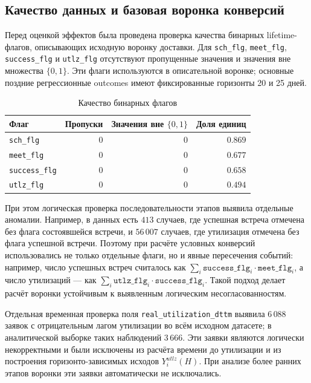 \documentclass[14pt,a4paper]{extarticle}
\begin{document}
\subsection{Качество данных и базовая воронка конверсий} 
\label{subsec:conversion_funnel_results}

Перед оценкой эффектов была проведена проверка качества бинарных lifetime-флагов, описывающих исходную воронку доставки. Для \texttt{sch\_flg}, \texttt{meet\_flg}, \texttt{success\_flg} и \texttt{utlz\_flg} отсутствуют пропущенные значения и значения вне множества \(\{0,1\}\). Эти флаги используются в описательной воронке; основные поздние регрессионные outcomes имеют фиксированные горизонты 20 и 25 дней.

\begin{table}[H]
    \centering
    \caption{Качество бинарных флагов}
    \label{tab:flag_quality}
    \small
    \begin{tabular}{lrrr}
        \toprule
        Флаг & Пропуски & Значения вне \(\{0,1\}\) & Доля единиц \\
        \midrule
        \texttt{sch\_flg} & \(0\) & \(0\) & \(0.869\) \\
        \texttt{meet\_flg} & \(0\) & \(0\) & \(0.677\) \\
        \texttt{success\_flg} & \(0\) & \(0\) & \(0.658\) \\
        \texttt{utlz\_flg} & \(0\) & \(0\) & \(0.494\) \\
        \bottomrule
    \end{tabular}
\end{table}

При этом логическая проверка последовательности этапов выявила отдельные аномалии. Например, в данных есть \(413\) случаев, где успешная встреча отмечена без флага состоявшейся встречи, и \(56\,007\) случаев, где утилизация отмечена без флага успешной встречи. Поэтому при расчёте условных конверсий использовались не только отдельные флаги, но и явные пересечения событий: например, число успешных встреч считалось как \(\sum_i \texttt{success\_flg}_i \cdot \texttt{meet\_flg}_i\), а число утилизаций --- как \(\sum_i \texttt{utlz\_flg}_i \cdot \texttt{success\_flg}_i\). Такой подход делает расчёт воронки устойчивым к выявленным логическим несогласованностям.

Отдельная временная проверка поля
\texttt{real\_utilization\_dttm} выявила \(6\,088\) заявок с отрицательным
лагом утилизации во всём исходном датасете; в аналитической выборке таких
наблюдений \(3\,666\). Эти заявки являются логически некорректными и были
исключены из расчёта времени до утилизации и из построения
горизонто-зависимых исходов \(Y_i^{utlz}(H)\). При анализе более ранних
этапов воронки эти заявки автоматически не исключались.
\end{document}
